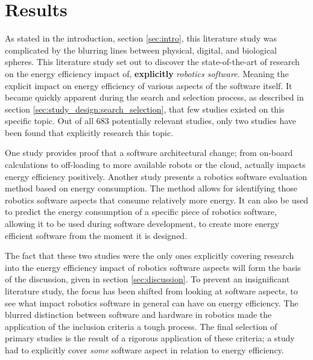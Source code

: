 \section{Results}
\label{sec:results}
As stated in the introduction, section \ref{sec:intro}, this literature study was complicated by 
the blurring lines between physical, digital, and biological spheres.
This literature study set out to discover the state-of-the-art of research on the energy efficiency impact of, \textbf{explicitly} \textit{robotics software}.
Meaning the explicit impact on energy efficiency of various aspects of the software itself.
It became quickly apparent during the search and selection process, as described in section \ref{sec:study_design:search_selection}, 
that few studies existed on this specific topic.
Out of all 683 potentially relevant studies, only two studies have been found that explicitly research this topic.

\vspace{5mm}

One study \cite{rahman2019cloud_robot_offloading} provides proof that a software architectural change; 
from on-board calculations to off-loading to more available robots or the cloud, actually impacts energy efficiency positively.
Another study \cite{hou2017novel_cloud_evaluation_model} presents a robotics software evaluation method based on energy consumption.
The method allows for identifying those robotics software aspects that consume relatively more energy. 
It can also be used to predict the energy consumption of a specific piece of robotics software, allowing it to be used during software development, 
to create more energy efficient software from the moment it is designed.

\vspace{5mm}

The fact that these two studies were the only ones explicitly covering research into the energy efficiency impact of robotics software aspects will
form the basis of the discussion, given in section \ref{sec:discussion}.
To prevent an insignificant literature study, the focus has been shifted from looking at software aspects, to see what impact 
robotics software in general can have on energy efficiency. The blurred distinction between software and hardware in robotics made the 
application of the inclusion criteria a tough process.
The final selection of primary studies is the result of a rigorous application of these criteria; 
a study had to explicitly cover \textit{some} software aspect in relation to energy efficiency.

